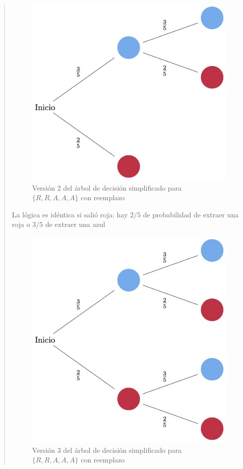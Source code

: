 \documentclass[
]{book}
\begin{document}
\begin{quote}
\begin{figure}
\centering
\includegraphics{./images/arbol_decision_3_2.jpeg}
\caption{Versión 2 del árbol de decisión simplificado para \(\{ R, R, A, A, A\}\) con reemplazo}
\end{figure}

La lógica es idéntica si salió roja: hay \(2/5\) de probabilidad de extraer una roja o \(3/5\) de extraer una azul

\begin{figure}
\centering
\includegraphics{./images/arbol_decision_3_3.jpeg}
\caption{Versión 3 del árbol de decisión simplificado para \(\{ R, R, A, A, A\}\) con reemplazo}
\end{figure}


\end{quote}
\end{document}
